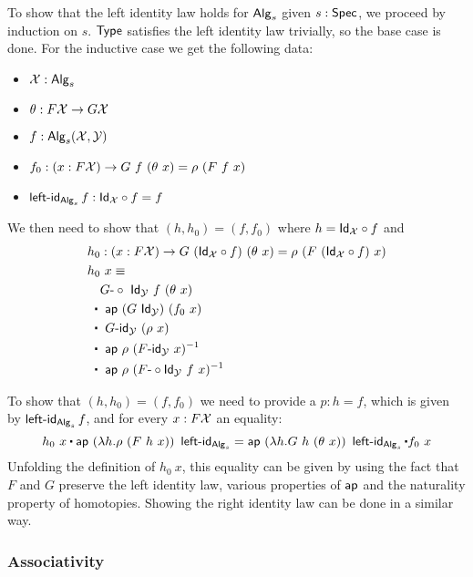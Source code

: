 \documentclass[a4paper,10pt]{article}
\begin{document}
To show that the left identity law holds for $\mathsf{Alg}_s$ given
$s : \mathsf{Spec}$, we proceed by induction on $s$. $\mathsf{Type}$ satisfies the left
identity law trivially, so the base case is done. For the inductive
case we get the following data:
%
\begin{itemize}
\item $\mathcal{X} : \mathsf{Alg}_s$
\item $\theta : F \mathcal{X} \to G \mathcal{X}$
\item $f : \mathsf{Alg}_s(\mathcal{X},\mathcal{Y})$ 
\item $f_0 : (x : F \alg{X}) \to G\ f\ (\theta\ x) = \rho\ (F\ f\ x)$
\item $\operatorname{\mathsf{left-id}}_{\mathsf{Alg}_s} f : \mathsf{Id}_{\mathcal{X}} \circ f = f$
\end{itemize}
%
We then need to show that $(h,h_0) = (f,f_0)$ where $h = \mathsf{Id}_{\mathcal{X}} \circ f$ and
\begin{align*}
  &h_0 : (x : F \alg{X}) \to G\ (\Id{\alg{X}} \circ f)\ (\theta\ x) = \rho\ (F\ (\Id{\alg{X}} \circ f)\ x) \\
  &h_0\ x \defeq \\
  &\ \ \    \Gcomp\ \Id{\alg{Y}}\ f\ (\theta\ x) \\
  &\ \ct\ \ap\ (G\ \Id{\alg{Y}})\ (f_0\ x) \\
  &\ \ct\ \Gid_{\alg{Y}}\ (\rho\ x) \\
  &\ \ct\ \ap\ \rho\ (\Fid_{\alg{Y}}\ x)^{-1} \\
  &\ \ct\ \ap\ \rho\ (\Fcomp \Id{\alg{Y}}\ f\ x)^{-1}
\end{align*}

To show that $(h,h_0) = (f,f_0)$ we need to provide a $p : h = f$,
which is given by $\operatorname{\mathsf{left-id}}_{\mathsf{Alg}_s} f$, and for every $x : F \mathcal{X}$ an equality:
$$
h_0\ x \ct \ap\ (\lambda h . \rho\ (F\ h\ x))\ \leftid_{\Alg_s} 
 = \ap\ (\lambda h . G\ h\ (\theta\ x))\ \leftid_{\Alg_s} \ct f_0\ x
$$
Unfolding the definition of $h_0\ x$, this equality can be given by
using the fact that $F$ and $G$ preserve the left identity law,
various properties of $\mathsf{ap}$ and the naturality property of
homotopies. Showing the right identity law can be done in a similar
way.

\subsubsection{Associativity}
\end{document}
